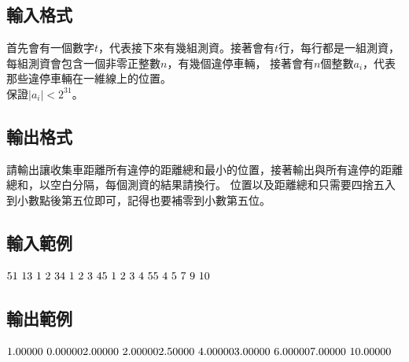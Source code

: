 \documentclass{article}
\begin{document}
\begin{CJK*}{UTF8}{bsmi}
\subsection*{輸入格式}
首先會有一個數字$t$，代表接下來有幾組測資。接著會有$t$行，每行都是一組測資，每組測資會包含一個非零正整數$n$，有幾個違停車輛，
接著會有$n$個整數$a_i$，代表那些違停車輛在一維線上的位置。\\
保證$\lvert a_i\rvert <2^{31}$。

\subsection*{輸出格式}
請輸出讓收集車距離所有違停的距離總和最小的位置，接著輸出與所有違停的距離總和，以空白分隔，每個測資的結果請換行。
位置以及距離總和只需要四捨五入到小數點後第五位即可，記得也要補零到小數第五位。

\subsection*{輸入範例}
$5\\1\ 1\\3\ 1\ 2\ 3\\4\ 1\ 2\ 3\ 4\\5\ 1\ 2\ 3\ 4\ 5\\5\ 4\ 5\ 7\ 9\ 10$

\subsection*{輸出範例}
$1.00000\ 0.00000\\2.00000\ 2.00000\\2.50000\ 4.00000\\3.00000\ 6.00000\\7.00000\ 10.00000$

\end{CJK*}
\end{document}
